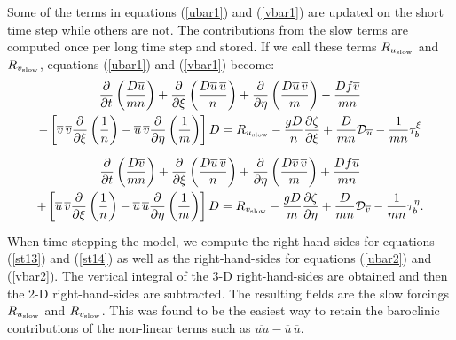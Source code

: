 Some of the terms in equations (\ref{ubar1}) and (\ref{vbar1}) are
updated on the short time step while others are not.  The contributions
from the slow terms are computed once per long time step and stored.  If
we call these terms $R_{u_{\rm slow}}$ and $R_{v_{\rm slow}}$, equations
(\ref{ubar1}) and (\ref{vbar1}) become:
\begin{multline}
   \frac{\partial}{\partial t} \left( \frac{D \overline{u}}{mn} \right)
   + \frac{\partial}{\partial \xi}
   \left( \frac{D \overline{u}\,\overline{u}}{n} \right)
   + \frac{\partial}{\partial \eta}
   \left( \frac{D \overline{u}\,\overline{v}}{m} \right)
   - \frac{Df\overline{v}}{mn}
\\ \vspace{1mm}
   - \left[ \overline{v}\,\overline{v}
   \frac{\partial}{\partial \xi}
   \left( \frac{1}{n} \right) - \overline{u}\,\overline{v}
   \frac{\partial}{\partial \eta} \left(
   \frac{1}{m} \right) \right] D = R_{u_{\rm slow}} -
   \frac{gD}{n} \frac{\partial \zeta}{\partial \xi}
    + \frac{D}{mn} {\cal D}_{\overline{u}}
   - \frac{1}{mn} \tau^{\xi}_b
\label{ubar2}
\end{multline}
\begin{multline}
   \frac{\partial}{\partial t} \left( \frac{D \overline{v}}{mn} \right)
   + \frac{\partial}{\partial \xi}
   \left( \frac{D \overline{u}\,\overline{v}}{n} \right)
   + \frac{\partial}{\partial \eta}
   \left( \frac{D \overline{v}\,\overline{v}}{m} \right)
   + \frac{Df\overline{u}}{mn}
\\ \vspace{1mm}
   + \left[ \overline{u}\,\overline{v}
   \frac{\partial}{\partial \xi}
   \left( \frac{1}{n} \right) - \overline{u}\,\overline{u}
   \frac{\partial}{\partial \eta} \left(
   \frac{1}{m} \right) \right] D = R_{v_{\rm slow}} -
   \frac{gD}{m} \frac{\partial \zeta}{\partial \eta}
    + \frac{ D}{mn} {\cal D}_{\overline{v}}
   - \frac{1}{mn} \tau^{\eta}_b .
\label{vbar2}
\end{multline}
When time stepping the model, we compute the right-hand-sides for
equations (\ref{st13}) and (\ref{st14}) as well as the
right-hand-sides for equations (\ref{ubar2}) and (\ref{vbar2}).  The
vertical integral of the 3-D right-hand-sides are obtained and then the
2-D right-hand-sides are subtracted.  The resulting fields are the slow
forcings $R_{u_{\rm slow}}$ and $R_{v_{\rm slow}}$.  This was found to
be the easiest way to retain the baroclinic contributions of the
non-linear terms such as $\overline{uu} - \overline{u}\,\overline{u}$.

